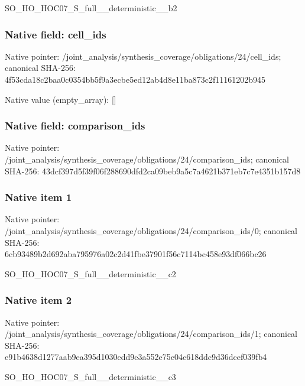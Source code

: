 \documentclass[10pt,a4paper]{article}
\begin{document}
\begingroup\raggedright\sloppy SO\_\allowbreak{}HO\_\allowbreak{}HOC07\_\allowbreak{}S\_\allowbreak{}full\_\allowbreak{}\_\allowbreak{}deterministic\_\allowbreak{}\_\allowbreak{}b2\par\endgroup

\subsubsection{Native field: cell\_\allowbreak{}ids}
Native pointer: /joint\_\allowbreak{}analysis/synthesis\_\allowbreak{}coverage/obligations/24/cell\_\allowbreak{}ids; canonical SHA-256: 4f53cda18c2baa0c0354bb5f9a3ecbe5ed12ab4d8e11ba873c2f11161202b945

Native value (empty\_\allowbreak{}array): []

\subsubsection{Native field: comparison\_\allowbreak{}ids}
Native pointer: /joint\_\allowbreak{}analysis/synthesis\_\allowbreak{}coverage/obligations/24/comparison\_\allowbreak{}ids; canonical SHA-256: 43dcf397d5f39f06f288690dfd2ca09beb9a5c7a4621b371eb7c7e4351b157d8

\subsubsection{Native item 1}
Native pointer: /joint\_\allowbreak{}analysis/synthesis\_\allowbreak{}coverage/obligations/24/comparison\_\allowbreak{}ids/0; canonical SHA-256: 6cb93489b2d692aba795976a02c2d41fbe37901f56c7114bc458e93df066bc26

\begingroup\raggedright\sloppy SO\_\allowbreak{}HO\_\allowbreak{}HOC07\_\allowbreak{}S\_\allowbreak{}full\_\allowbreak{}\_\allowbreak{}deterministic\_\allowbreak{}\_\allowbreak{}c2\par\endgroup

\subsubsection{Native item 2}
Native pointer: /joint\_\allowbreak{}analysis/synthesis\_\allowbreak{}coverage/obligations/24/comparison\_\allowbreak{}ids/1; canonical SHA-256: e91b4638d1277aab9ea395d1030edd9e3a552e75c04c618ddc9d36dcef039fb4

\begingroup\raggedright\sloppy SO\_\allowbreak{}HO\_\allowbreak{}HOC07\_\allowbreak{}S\_\allowbreak{}full\_\allowbreak{}\_\allowbreak{}deterministic\_\allowbreak{}\_\allowbreak{}c3\par\endgroup
\end{document}
